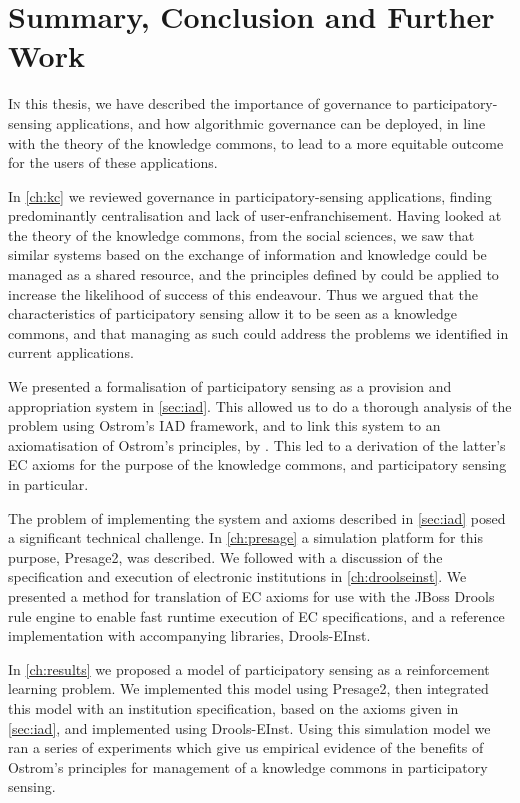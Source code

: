 \acresetall
\chapter{Summary, Conclusion and Further Work}

\lettrine[lines=3]{I}{n} this thesis, we have described the importance of
governance to participatory-sensing applications, and how algorithmic
governance can be deployed, in line with the theory of the knowledge commons,
to lead to a more equitable outcome for the users of these applications.

In \autoref{ch:kc} we reviewed governance in participatory-sensing
applications, finding predominantly centralisation and lack of 
user-enfranchisement. Having looked at the theory of the knowledge commons, from
the social sciences, we saw that similar systems based on the exchange of
information and knowledge could be managed as a shared resource, and the
principles defined by \citet{Ostrom1990} could be applied to increase the
likelihood of success of this endeavour. Thus we argued that the
characteristics of participatory sensing allow it to be seen as a knowledge
commons, and that managing as such could address the problems we identified in
current applications.

We presented a formalisation of participatory sensing as a provision and
appropriation system in \autoref{sec:iad}. This allowed us to do a thorough
analysis of the problem using Ostrom's \ac{IAD} framework, and to link this
system to an axiomatisation of Ostrom's principles, by \citet{Pitt2012b}. This
led to a derivation of the latter's \ac{EC} axioms for the purpose of the
knowledge commons, and participatory sensing in particular.

The problem of implementing the system and axioms described in
\autoref{sec:iad} posed a significant technical challenge. In
\autoref{ch:presage} a simulation platform for this purpose, Presage2, was
described. We followed with a discussion of the specification and execution of
electronic institutions in \autoref{ch:droolseinst}. We presented a method for
translation of \ac{EC} axioms for use with the JBoss Drools rule engine to
enable fast runtime execution of \ac{EC} specifications, and a reference
implementation with accompanying libraries, Drools-EInst.

In \autoref{ch:results} we proposed a model of participatory sensing as a
reinforcement learning problem. We implemented this model using Presage2, then
integrated this model with an institution specification, based on the axioms
given in \autoref{sec:iad}, and implemented using Drools-EInst. Using this
simulation model we ran a series of experiments which give us empirical
evidence of the benefits of Ostrom's principles for management of a knowledge
commons in participatory sensing.

